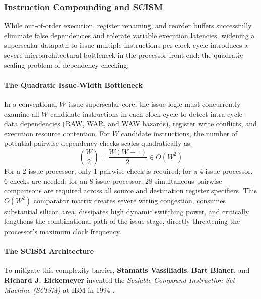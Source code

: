 \subsubsection{Instruction Compounding and SCISM}\label{sec:scism}

While out-of-order execution, register renaming, and reorder buffers successfully eliminate false dependencies and tolerate variable execution latencies, widening a superscalar datapath to issue multiple instructions per clock cycle introduces a severe microarchitectural bottleneck in the processor front-end: the quadratic scaling problem of dependency checking.

\paragraph{The Quadratic Issue-Width Bottleneck}
In a conventional $W$-issue superscalar core, the issue logic must concurrently examine all $W$ candidate instructions in each clock cycle to detect intra-cycle data dependencies (RAW, WAR, and WAW hazards), register write conflicts, and execution resource contention. For $W$ candidate instructions, the number of potential pairwise dependency checks scales quadratically as:
\begin{equation}
\binom{W}{2} = \frac{W(W-1)}{2} \in O(W^2)
\end{equation}
For a 2-issue processor, only 1 pairwise check is required; for a 4-issue processor, 6 checks are needed; for an 8-issue processor, 28 simultaneous pairwise comparisons are required across all source and destination register specifiers. This $O(W^2)$ comparator matrix creates severe wiring congestion, consumes substantial silicon area, dissipates high dynamic switching power, and critically lengthens the combinational path of the issue stage, directly threatening the processor's maximum clock frequency.

\paragraph{The SCISM Architecture}
To mitigate this complexity barrier, \textbf{Stamatis Vassiliadis}, \textbf{Bart Blaner}, and \textbf{Richard J. Eickemeyer} invented the \textit{Scalable Compound Instruction Set Machine (SCISM)} at IBM in 1994 \cite{vassiliadis1994scism}. 


